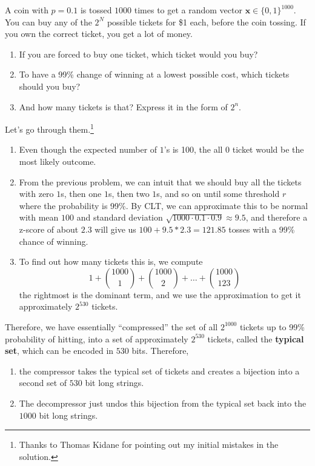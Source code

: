   \begin{exercise}
    A coin with $p = 0.1$ is tossed $1000$ times to get a random vector $\mathbf{x} \in \{0, 1\}^{1000}$. You can buy any of the $2^N$ possible tickets for \$1 each, before the coin tossing. If you own the correct ticket, you get a lot of money. 
    \begin{enumerate}
      \item If you are forced to buy one ticket, which ticket would you buy? 
      \item To have a 99\% change of winning at a lowest possible cost, which tickets should you buy? 
      \item And how many tickets is that? Express it in the form of $2^n$. 
    \end{enumerate}
  \end{exercise}
  \begin{solution}
    Let's go through them.\footnote{Thanks to Thomas Kidane for pointing out my initial mistakes in the solution.}
    \begin{enumerate}
      \item Even though the expected number of $1$'s is 100, the all $0$ ticket would be the most likely outcome. 
      \item From the previous problem, we can intuit that we should buy all the tickets with zero $1$s, then one $1$s, then two $1$s, and so on until some threshold $r$ where the probability is 99\%. By CLT, we can approximate this to be normal with mean $100$ and standard deviation $\sqrt{1000 \cdot 0.1 \cdot 0.9} \approx 9.5$, and therefore a z-score of about $2.3$ will give us $100 + 9.5 * 2.3 = 121.85$ tosses with a 99\% chance of winning. 
      \item To find out how many tickets this is, we compute 
        \begin{equation}
          1 + \binom{1000}{1} + \binom{1000}{2} + \ldots + \binom{1000}{123}
        \end{equation}
        the rightmost is the dominant term, and we use the approximation to get it approximately $2^{530}$ tickets.  
    \end{enumerate}
  \end{solution}

  Therefore, we have essentially ``compressed'' the set of all $2^{1000}$ tickets up to 99\% probability of hitting, into a set of approximately $2^{530}$ tickets, called the \textbf{typical set}, which can be encoded in $530$ bits. Therefore, 
  \begin{enumerate}
    \item the compressor takes the typical set of tickets and creates a bijection into a second set of $530$ bit long strings. 
    \item The decompressor just undos this bijection from the typical set back into the $1000$ bit long strings. 
  \end{enumerate}

